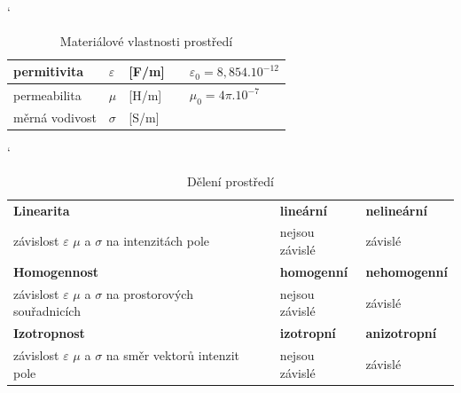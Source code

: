\begin{table}[!h]
\catcode` 
\begin{center}
  	\caption{Materiálové vlastnosti prostředí}
  	\label{tab:evlny_parametry_prostredi}
\begin{tabular}{|lllp{2cm}l|}
	\hline
	permitivita		& $\varepsilon$	& [F/m] & 	& $\varepsilon_{0} = 8,854.10^{-12} $\\
	\hline
	permeabilita		& $\mu$		& [H/m] & 	& $\mu_{0} = 4\pi.10^{-7} $\\
	\hline
	měrná vodivost	& $\sigma$		& [S/m] & 	&\\
	\hline
\end{tabular}
\end{center}
\end{table}
\begin{table}[!h]
\catcode` 
\begin{center}
  	\caption{Dělení prostředí}
  	\label{tab:evlny_vlastnosti_prostredi}
\begin{tabular}{|lp{0.3cm}|l|l|}
	\hline
	{\bf Linearita}									& & {\bf lineární}	& {\bf nelineární}	\\
	závislost $\varepsilon$ $\mu$ a $\sigma$ na intenzitách pole 		& & nejsou závislé 	& závislé		\\ 
	\hline
	{\bf Homogennost}								& & {\bf homogenní}	& {\bf nehomogenní}	\\
	závislost $\varepsilon$ $\mu$ a $\sigma$ na prostorových souřadnicích 	& & nejsou závislé 	& závislé		\\
	\hline
	{\bf Izotropnost}								& & {\bf izotropní}	& {\bf anizotropní}	\\
	závislost $\varepsilon$ $\mu$ a $\sigma$ na směr vektorů intenzit pole 	& & nejsou závislé 	& závislé		\\
	\hline
\end{tabular}
\end{center}
\end{table}

